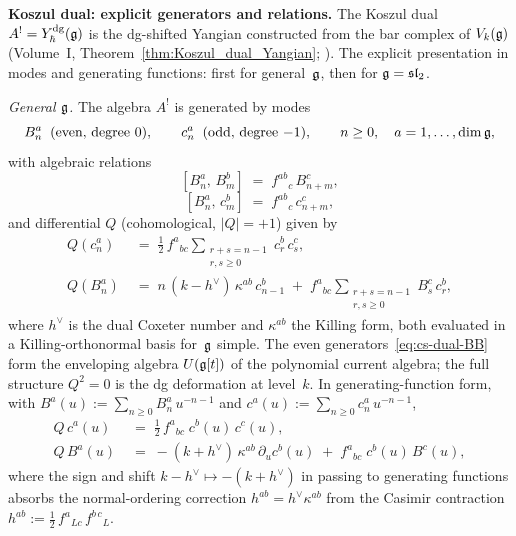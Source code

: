 \noindent\textbf{Koszul dual: explicit generators and relations.}
\label{par:cs-koszul-dual-explicit}%
%
%
The Koszul dual $A^! = Y_\hbar^{\mathrm{dg}}(\mathfrak{g})$ is the
dg-shifted Yangian constructed from the bar complex of
$V_k(\mathfrak{g})$ (Volume~I,
Theorem~\ref*{thm:Koszul_dual_Yangian};
\cite{DNP25}). The explicit presentation in modes and generating functions:
first for general~$\mathfrak{g}$, then for $\mathfrak{g} = \mathfrak{sl}_2$.

\smallskip
\noindent
\emph{General $\mathfrak{g}$.}
The algebra $A^!$ is generated by modes
\begin{equation}\label{eq:cs-dual-generators}
B_n^a \;\;(\text{even, degree $0$}),
\qquad
c_n^a \;\;(\text{odd, degree $-1$}),
\qquad
n \ge 0,\quad a = 1, \ldots, \dim \mathfrak{g},
\end{equation}
with algebraic relations
\begin{equation}\label{eq:cs-dual-BB}
[B_n^a,\, B_m^b] \;=\; f^{ab}{}_{c}\, B_{n+m}^c,
\end{equation}
\begin{equation}\label{eq:cs-dual-Bc}
[B_n^a,\, c_m^b] \;=\; f^{ab}{}_{c}\, c_{n+m}^c,
\end{equation}
and differential $Q$ (cohomological, $|Q| = +1$) given by
\begin{align}
Q(c_n^a)
&\;=\;
\tfrac{1}{2}\, f^{a}{}_{bc}
\sum_{\substack{r+s = n-1 \\ r,s \ge 0}} c_r^b\, c_s^c,
\label{eq:cs-Q-ghost}
\\[4pt]
Q(B_n^a)
&\;=\;
n\,(k - h^\vee)\,\kappa^{ab}\, c_{n-1}^b
\;+\;
f^{a}{}_{bc}
\sum_{\substack{r+s = n-1 \\ r,s \ge 0}}
B_s^c\, c_r^b,
\label{eq:cs-Q-current}
\end{align}
where $h^\vee$ is the dual Coxeter number and $\kappa^{ab}$
the Killing form, both evaluated in a Killing-orthonormal basis
for~$\mathfrak{g}$ simple.
The even generators~\eqref{eq:cs-dual-BB} form the
enveloping algebra $U(\mathfrak{g}[t])$ of the polynomial current
algebra; the full structure
$Q^2 = 0$ is the dg deformation at level~$k$.
In generating-function form, with
$B^a(u) := \sum_{n \ge 0} B_n^a\, u^{-n-1}$
and
$c^a(u) := \sum_{n \ge 0} c_n^a\, u^{-n-1}$,
\begin{align}
Q\, c^a(u)
&\;=\;
\tfrac{1}{2}\, f^{a}{}_{bc}\; c^b(u)\, c^c(u),
\label{eq:cs-Q-ghost-gf}
\\[4pt]
Q\, B^a(u)
&\;=\;
-(k + h^\vee)\,\kappa^{ab}\,\partial_u c^b(u)
\;+\;
f^{a}{}_{bc}\; c^b(u)\, B^c(u),
\label{eq:cs-Q-current-gf}
\end{align}
where the sign and shift
$k - h^\vee \mapsto -(k + h^\vee)$ in passing to
generating functions absorbs the normal-ordering correction
$h^{ab} = h^\vee \kappa^{ab}$ from the
Casimir contraction
$h^{ab} := \tfrac{1}{2}\,
f^{a}{}_{Lc}\, f^{b\,c}{}_{L}$.

